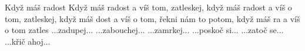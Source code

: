 \begin{TEXT}{Když máš radost}
\SLOKA Když máš radost a víš  tom, zatleskej,
když máš radost a víš o tom, zatleskej,
když máš dost a víš o tom,
řekni nám to  potom,
když máš ra a víš o tom zatles
\SLOKA ...zadupej...
\SLOKA ...zabouchej...
\SLOKA ...zamrkej...
\SLOKA ...poskoč si...
\SLOKA ...zatoč se...
\SLOKA ...křič ahoj...
\end{TEXT}